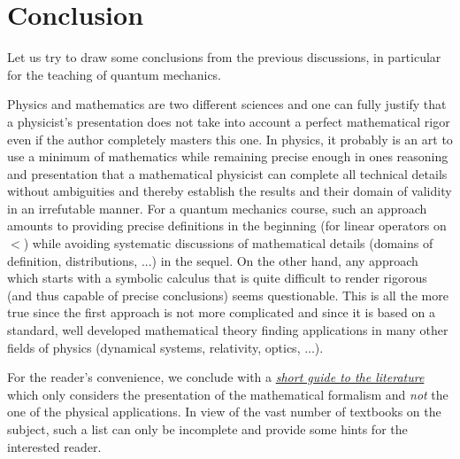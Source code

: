 \documentclass[a4wide,12pt]{report}
\begin{document}
 
\chapter{Conclusion}
 
Let us try to draw some conclusions from the previous discussions, 
in particular for the teaching of quantum mechanics. 

Physics and mathematics are two different sciences and one can 
fully justify that a physicist's presentation does not 
take into account a perfect mathematical rigor even if the author 
completely masters this one. In physics, 
it probably is an art to use a minimum of mathematics while 
remaining precise enough in ones reasoning and  presentation
that a mathematical physicist can complete all technical details   
 without ambiguities and thereby establish the results and 
 their domain of validity in an irrefutable manner. 
For a quantum mechanics course, 
such an approach amounts to providing 
precise definitions in the beginning (for linear operators 
on $\lt$) while avoiding systematic discussions of  
mathematical details (domains of definition, distributions, ...)
in the sequel. 
On the other hand, any approach which starts with 
a symbolic calculus that 
is quite difficult to render rigorous (and thus capable  
of precise conclusions) seems questionable. 
This is all the more true since the first approach is not more complicated 
and since it is based on a standard, well developed 
mathematical theory finding applications in many other fields 
of physics (dynamical systems, relativity, optics, ...). 

\medskip 

For the reader's convenience, we conclude with a 
{\underline{\em short guide to the literature}}
which only considers the presentation of the 
mathematical formalism and {\em not} the one of the physical 
applications. In view of the vast number of textbooks 
on the subject, such a list can only be incomplete
and provide some hints for the interested reader. 
\end{document}
